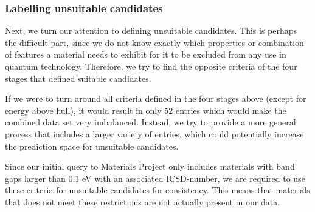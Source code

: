 \begin{table}[!ht]
\centering
\caption{A table that compares two different implementations of the same screen procedure. \citeauthor{Ferrenti2020} extracted information March of $2020$, while we did the extraction during April of $2021$. The adjusted difference is given as our reported entries divided on their reported entries.}
\label{tab:approach-1-suitable-candidates}
\noindent{}
\end{table}

\subsubsection{Labelling unsuitable candidates}

Next, we turn our attention to defining unsuitable candidates. This is perhaps the difficult part, since we do not know exactly which properties or combination of features a material needs to exhibit for it to be excluded from any use in quantum technology. Therefore, we try to find the opposite criteria of the four stages that defined suitable candidates.

If we were to turn around all criteria defined in the four stages above (except for energy above hull), it would result in only $52$ entries which would make the combined data set very imbalanced. Instead, we try to provide a more general process that includes a larger variety of entries, which could potentially increase the prediction space for unsuitable candidates.

Since our initial query to Materials Project only includes materials with band gaps larger than $0.1$ eV with an associated ICSD-number, we are required to use these criteria for unsuitable candidates for consistency. This means that materials that does not meet these restrictions are not actually present in our data.

